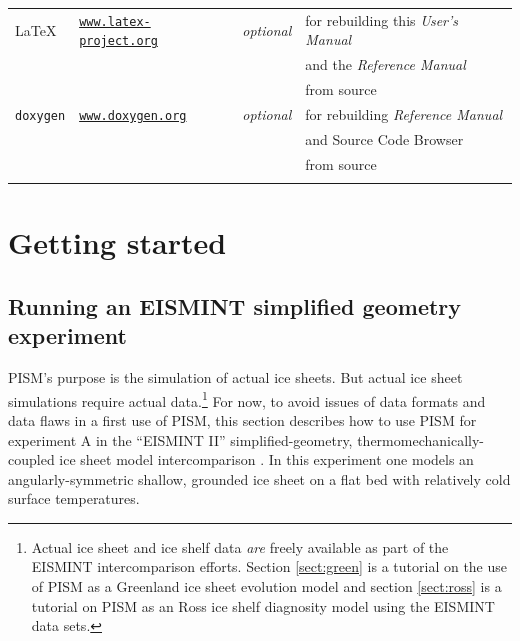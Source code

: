 \documentclass[11pt,final]{amsart}
\renewcommand{\t}[1]{\texttt{#1}}
\begin{document}
\begin{table}[ht]
\begin{tabular}{@{}llll}
\hline
\LaTeX & \href{http://www.latex-project.org/}{\t{www.latex-project.org}} & \emph{optional} & for rebuilding this \emph{User's Manual}  \\
 & & & and the \emph{Reference Manual} \\
 & & & from source \\
\texttt{doxygen}\index{doxygen} & \href{http://www.stack.nl/~dimitri/doxygen/}{\t{www.doxygen.org}} & \emph{optional}  & for rebuilding \emph{Reference Manual} \\
 & & & and Source Code Browser \\
 & & & from source \\
\hline
\normalsize
\end{tabular}
\end{table}


\clearpage\newpage
\section{Getting started}\label{sect:start}

\subsection{Running an EISMINT simplified geometry experiment}  PISM's purpose is the simulation of actual ice sheets.  But actual ice sheet simulations require actual data.\footnote{Actual ice sheet and ice shelf data \emph{are} freely available as part of the EISMINT intercomparison efforts.  Section \ref{sect:green} is a tutorial on the use of PISM as a Greenland ice sheet evolution model and section \ref{sect:ross} is a tutorial on PISM as an Ross ice shelf diagnosity model using the EISMINT data sets.}  For now, to avoid issues of data formats and data flaws in a first use of PISM, this section describes how to use PISM for experiment A in the ``EISMINT II'' simplified-geometry, thermomechanically-coupled ice sheet model intercomparison \cite{EISMINT00}.  In this experiment one models an angularly-symmetric shallow, grounded ice sheet on a flat bed with relatively cold surface temperatures.
\end{document}
